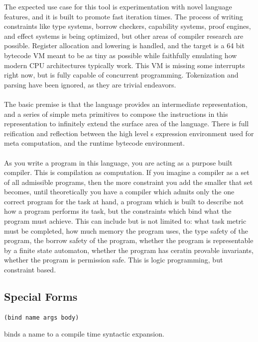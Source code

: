 \documentclass{article}
\begin{document}
	The expected use case for this tool is experimentation with novel language features, and it is built to promote fast iteration times. The process of writing constraints like type systems, borrow checkers, capability systems, proof engines, and effect systems is being optimized, but other areas of compiler research are possible. Register allocation and lowering is handled, and the target is a 64 bit bytecode VM meant to be as tiny as possible while faithfully emulating how modern CPU architectures typically work. This VM is missing some interrupts right now, but is fully capable of concurrent programming. Tokenization and parsing have been ignored, as they are trivial endeavors.\\\\

	The basic premise is that the language provides an intermediate representation, and a series of simple meta primitives to compose the instructions in this representation to infinitely extend the surface area of the language. There is full reification and reflection between the high level s expression environment used for meta computation, and the runtime bytecode environment.\\\\

	As you write a program in this language, you are acting as a purpose built compiler. This is compilation as computation. If you imagine a compiler as a set of all admissible programs, then the more constraint you add the smaller that set becomes, until theoretically you have a compiler which admits only the one correct program for the task at hand, a program which is built to describe not how a program performs its task, but the constraints which bind what the program must achieve. This can include but is not limited to: what task metric must be completed, how much memory the program uses, the type safety of the program, the borrow safety of the program, whether the program is representable by a finite state automaton, whether the program has ceratin provable invariants, whether the program is permission safe. This is logic programming, but constraint based.
	\subsection{Special Forms}

	\begin{Verbatim}[tabsize=4]
(bind name args body) 
	\end{Verbatim}
	binds a name to a compile time syntactic expansion.
\end{document}
